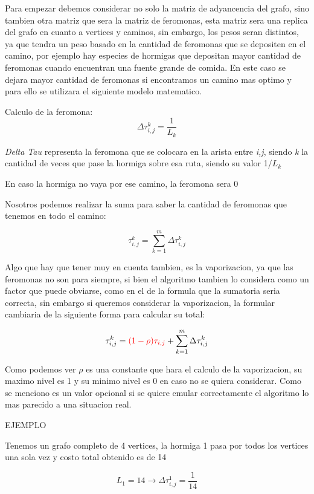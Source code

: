 \documentclass[12pt]{article}
\begin{document}
Para empezar debemos considerar no solo la matriz de adyancencia del grafo, sino tambien otra matriz que sera la matriz de feromonas, esta matriz sera una replica del grafo en cuanto
a vertices y caminos, sin embargo, los pesos seran distintos, ya que tendra un peso basado en la cantidad de feromonas que se depositen en el camino, por ejemplo hay especies de hormigas
que depositan mayor cantidad de feromonas cuando encuentran una fuente grande de comida. En este caso se dejara mayor cantidad de feromonas si encontramos un camino mas optimo y para ello
se utilizara el siguiente modelo matematico.

Calculo de la feromona: $$\Delta\tau_{i,j}^k={  \frac{1}{L_k}}$$

\textit{Delta Tau} representa la feromona que se colocara en la arista entre \textit{i,j}, siendo \textit{k} la cantidad de veces que pase la hormiga sobre esa ruta, siendo su valor 1/$L_k$

En caso la hormiga no vaya por ese camino, la feromona sera 0

Nosotros podemos realizar la suma para saber la cantidad de feromonas que tenemos en todo el camino:

$$\tau_{i,j}^k=\sum_{k=1}^{m} \Delta\tau_{i,j}^k$$

Algo que hay que tener muy en cuenta tambien, es la vaporizacion, ya que las feromonas no son para siempre, si bien el algoritmo tambien lo considera como un factor que puede obviarse,
como en el de la formula que la sumatoria seria correcta, sin embargo si queremos considerar la vaporizacion, la formular cambiaria de la siguiente forma para calcular su total:

$$\tau_{i,j}^k=\textcolor{red}{(1-\rho)\tau_{i,j}}+\sum_{k=1}^{m} \Delta\tau_{i,j}^k$$

Como podemos ver \textit{$\rho$} es una constante que hara el calculo de la vaporizacion,
su maximo nivel es 1 y su minimo nivel es 0 en caso no se quiera considerar. Como se menciono
es un valor opcional si se quiere emular correctamente el algoritmo lo mas parecido a una situacion real.


\vspace{25mm}

EJEMPLO

\vspace{5mm}

Tenemos un grafo completo de 4 vertices, la hormiga 1 pasa por todos los vertices una sola vez y costo total obtenido es de 14

$$L_1=14 \rightarrow \Delta\tau_{i,j}^1=\frac{1}{14}$$
\end{document}
